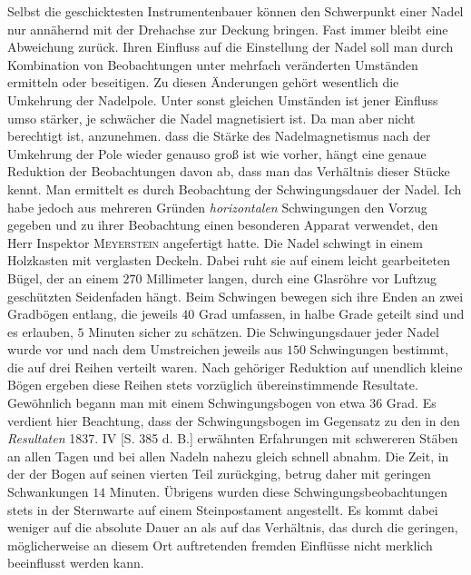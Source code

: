 Selbst die geschicktesten Instrumentenbauer können den Schwerpunkt einer Nadel nur annähernd mit der Drehachse zur Deckung bringen. Fast immer bleibt eine Abweichung zurück. Ihren Einfluss auf die Einstellung der Nadel soll man durch Kombination von Beobachtungen unter mehrfach veränderten Umständen ermitteln oder beseitigen. Zu diesen Änderungen gehört wesentlich die Umkehrung der Nadelpole. Unter sonst gleichen Umständen ist jener Einfluss umso stärker, je schwächer die Nadel magnetisiert ist. Da man aber nicht berechtigt ist, anzunehmen. dass die Stärke des Nadelmagnetismus nach der Umkehrung der Pole wieder genauso groß ist wie vorher, hängt eine genaue Reduktion der Beobachtungen davon ab, dass man das Verhältnis dieser Stücke kennt. Man ermittelt es durch Beobachtung der Schwingungsdauer der Nadel. Ich habe jedoch aus mehreren Gründen \textit{horizontalen} Schwingungen den Vorzug gegeben und zu ihrer Beobachtung einen besonderen Apparat verwendet, den Herr Inspektor \textsc{Meyerstein} angefertigt hatte. Die Nadel schwingt in einem Holzkasten mit verglasten Deckeln. Dabei ruht sie auf einem leicht gearbeiteten Bügel, der an einem $270$ Millimeter langen, durch eine Glasröhre vor Luftzug geschützten Seidenfaden hängt. Beim Schwingen bewegen sich ihre Enden an zwei Gradbögen entlang, die jeweils $40$ Grad umfassen, in halbe Grade geteilt sind und es erlauben, $5$ Minuten sicher zu schätzen. Die Schwingungsdauer jeder Nadel wurde vor und nach dem Umstreichen jeweils aus $150$ Schwingungen bestimmt, die auf drei Reihen verteilt waren. Nach gehöriger Reduktion auf unendlich kleine Bögen ergeben diese Reihen stets vorzüglich übereinstimmende Resultate. Gewöhnlich begann man mit einem Schwingungsbogen von etwa $36$ Grad. Es verdient hier Beachtung, dass der Schwingungsbogen im Gegensatz zu den in den \textit{Resultaten} 1837. IV [S. 385 d. B.] erwähnten Erfahrungen mit schwereren Stäben an allen Tagen und bei allen Nadeln nahezu gleich schnell abnahm. Die Zeit, in der der Bogen auf seinen vierten Teil zurückging, betrug daher mit geringen Schwankungen $14$ Minuten. Übrigens wurden diese Schwingungsbeobachtungen stets in der Sternwarte auf einem Steinpostament angestellt. Es kommt dabei weniger auf die absolute Dauer an als auf das Verhältnis, das durch die geringen, möglicherweise an diesem Ort auftretenden fremden Einflüsse nicht merklich beeinflusst werden kann.

